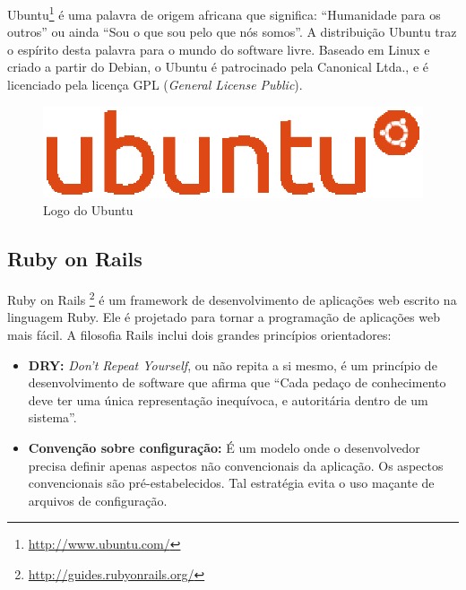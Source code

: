 Ubuntu\footnote{\url{http://www.ubuntu.com/}} é uma palavra de origem africana que significa: ``Humanidade para os outros'' ou ainda ``Sou o que sou pelo que nós somos''. A distribuição Ubuntu traz o espírito desta palavra para o mundo do software livre. Baseado em Linux e criado a partir do Debian, o Ubuntu é patrocinado pela Canonical Ltda., e é licenciado pela licença GPL (\textit{General License Public}).

\begin{figure}[!h]
	\centering
	\includegraphics[scale=0.4]{figuras/capitulo3/ubuntu.eps}
	\caption{Logo do Ubuntu}
	\label{ubuntu}
\end{figure}

\subsection{Ruby on Rails}

Ruby on Rails \footnote{\url{http://guides.rubyonrails.org/}} é um framework de desenvolvimento de aplicações web escrito na linguagem Ruby. Ele é projetado para tornar a programação de aplicações web mais fácil. A filosofia Rails inclui dois grandes princípios orientadores:

\begin{itemize}
	\item \textbf{DRY:} \textit{Don't Repeat Yourself}, ou não repita a si mesmo, é um princípio de desenvolvimento de software que afirma que ``Cada pedaço de conhecimento deve ter uma única representação inequívoca, e autoritária dentro de um sistema''.

	\item \textbf{Convenção sobre configuração:} É um modelo onde o desenvolvedor precisa definir apenas aspectos não convencionais da aplicação. Os aspectos convencionais são pré-estabelecidos. Tal estratégia evita o uso maçante de arquivos de configuração.
\end{itemize}

